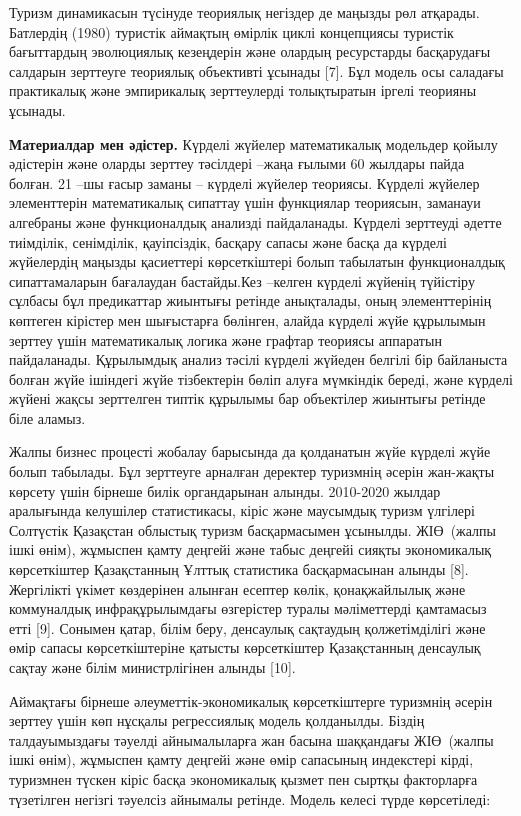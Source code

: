 Туризм динамикасын түсінуде теориялық негіздер де маңызды рөл атқарады.
Батлердің (1980) туристік аймақтың өмірлік циклі концепциясы туристік
бағыттардың эволюциялық кезеңдерін және олардың ресурстарды басқарудағы
салдарын зерттеуге теориялық объективті ұсынады {[}7{]}. Бұл модель осы
саладағы практикалық және эмпирикалық зерттеулерді толықтыратын іргелі
теорияны ұсынады.

{\bfseries Материалдар мен әдістер.} Күрделі жүйелер математикалық
модельдер қойылу әдістерін және оларды зерттеу тәсілдері --жаңа ғылыми
60 жылдары пайда болған. 21 --шы ғасыр заманы -- күрделі жүйелер
теориясы. Күрделі жүйелер элементтерін математикалық сипаттау үшін
функциялар теориясын, заманауи алгебраны және функционалдық анализді
пайдаланады. Күрделі зерттеуді әдетте тиімділік, сенімділік,
қауіпсіздік, басқару сапасы және басқа да күрделі жүйелердің маңызды
қасиеттері көрсеткіштері болып табылатын функционалдық сипаттамаларын
бағалаудан бастайды.Кез --келген күрделі жүйенің түйістіру сұлбасы бұл
предикаттар жиынтығы ретінде анықталады, оның элементтерінің көптеген
кірістер мен шығыстарға бөлінген, алайда күрделі жүйе құрылымын зерттеу
үшін математикалық логика және графтар теориясы аппаратын пайдаланады.
Құрылымдық анализ тәсілі күрделі жүйеден белгілі бір байланыста болған
жүйе ішіндегі жүйе тізбектерін бөліп алуға мүмкіндік береді, және
күрделі жүйені жақсы зерттелген типтік құрылымы бар объектілер жиынтығы
ретінде біле аламыз.

Жалпы бизнес процесті жобалау барысында да қолданатын жүйе күрделі жүйе
болып табылады. Бұл зерттеуге арналған деректер туризмнің әсерін
жан-жақты көрсету үшін бірнеше билік органдарынан алынды. 2010-2020
жылдар аралығында келушілер статистикасы, кіріс және маусымдық туризм
үлгілері Солтүстік Қазақстан облыстық туризм басқармасымен ұсынылды.
ЖІӨ~(жалпы ішкі өнім), жұмыспен қамту деңгейі және табыс деңгейі сияқты
экономикалық көрсеткіштер Қазақстанның Ұлттық статистика басқармасынан
алынды {[}8{]}. Жергілікті үкімет көздерінен алынған есептер көлік,
қонақжайлылық және коммуналдық инфрақұрылымдағы өзгерістер туралы
мәліметтерді қамтамасыз етті {[}9{]}. Сонымен қатар, білім беру,
денсаулық сақтаудың қолжетімділігі және өмір сапасы көрсеткіштеріне
қатысты көрсеткіштер Қазақстанның денсаулық сақтау және білім
министрлігінен алынды {[}10{]}.

Аймақтағы бірнеше әлеуметтік-экономикалық көрсеткіштерге туризмнің
әсерін зерттеу үшін көп нұсқалы регрессиялық модель қолданылды. Біздің
талдауымыздағы тәуелді айнымалыларға жан басына шаққандағы ЖІӨ~(жалпы
ішкі өнім), жұмыспен қамту деңгейі және өмір сапасының индекстері кірді,
туризмнен түскен кіріс басқа экономикалық қызмет пен сыртқы факторларға
түзетілген негізгі тәуелсіз айнымалы ретінде. Модель келесі түрде
көрсетіледі:

